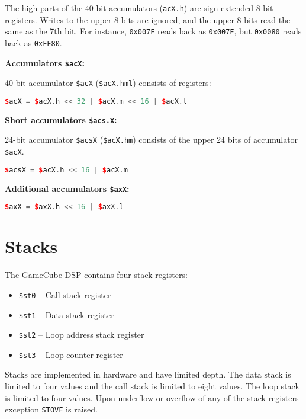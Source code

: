 \documentclass[oneside,english,a4paper,10pt,oneside,openany,final]{memoir}
\newcommand{\Exception}[1]{\texttt{#1}}
\newcommand{\Register}[1]{\texttt{#1}}
\newcommand{\Value}[1]{\texttt{#1}}
\begin{document}
The high parts of the 40-bit accumulators (\Register{acX.h}) are sign-extended 8-bit registers.  Writes to the upper 8 bits are ignored,
and the upper 8 bits read the same as the 7th bit.  For instance, \Value{0x007F} reads back as \Value{0x007F}, but \Value{0x0080} reads
back as \Value{0xFF80}.

\textbf{Accumulators \Register{\$acX}:}

40-bit accumulator \Register{\$acX} (\Register{\$acX.hml}) consists of registers:

\begin{lstlisting}[language=C++]
$acX = $acX.h << 32 | $acX.m << 16 | $acX.l
\end{lstlisting}

\textbf{Short accumulators \Register{\$acs.X}:}

24-bit accumulator \Register{\$acsX} (\Register{\$acX.hm}) consists of the upper 24 bits of accumulator \Register{\$acX}.

\begin{lstlisting}[language=C++]
$acsX = $acX.h << 16 | $acX.m
\end{lstlisting}

\textbf{Additional accumulators \Register{\$axX}:}

\begin{lstlisting}[language=C++]
$axX = $axX.h << 16 | $axX.l
\end{lstlisting}

\pagebreak{}

\section{Stacks}

The GameCube DSP contains four stack registers:

\begin{itemize}
  \item \Register{\$st0} -- Call stack register
  \item \Register{\$st1} -- Data stack register
  \item \Register{\$st2} -- Loop address stack register
  \item \Register{\$st3} -- Loop counter register
\end{itemize}

Stacks are implemented in hardware and have limited depth. The data stack is limited to four values
and the call stack is limited to eight values. The loop stack is limited to four values.
Upon underflow or overflow of any of the stack registers exception \Exception{STOVF} is raised.
\end{document}
